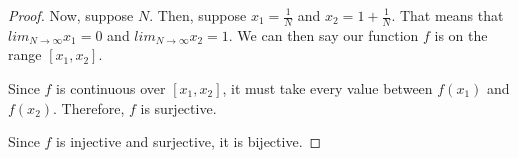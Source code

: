 \documentclass[11pt,reqno,oneside,a4paper]{article}
\begin{document}
\begin{proof}
Now, suppose $N$. Then, suppose $x_1 = \frac{1}{N}$ and $x_2 = 1 + \frac{1}{N}$. That means that $lim_{N\to\infty} x_1 = 0$ and $lim_{N\to\infty} x_2 = 1$. We can then say our function $f$ is on the range $[x_1, x_2]$. 

Since $f$ is continuous over $[x_1, x_2]$, it must take every value between $f(x_1)$ and $f(x_2)$. Therefore, $f$ is surjective.

Since $f$ is injective and surjective, it is bijective.

\end{proof}
\end{document}
